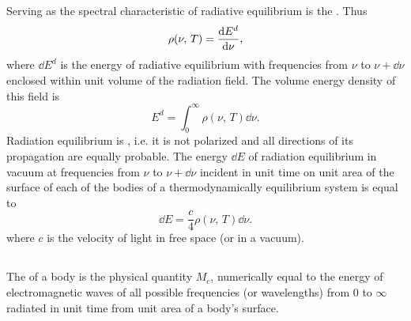 \subsection{}\label{36.1.3} Serving as the spectral characteristic of radiative equilibrium is the . Thus
\begin{equation*}%
\rho (\nu,\, T) = \dv{E^{d}}{\nu},
\end{equation*}
where $\dd E^{d}$ is the energy of radiative equilibrium with frequencies from $\nu$ to $\nu + \dd \nu$ enclosed within unit volume of the radiation field. The volume energy density of this field is
\begin{equation*}%
E^{d} = \int_{0}^{\infty} \rho (\nu,\, T) \dd \nu.
\end{equation*}
Radiation equilibrium is , i.e. it is not polarized and all directions of its propagation are equally probable. The energy $\dd E$ of radiation equilibrium in vacuum at frequencies from $\nu$ to $\nu + \dd \nu$ incident in unit time on unit area of the surface of each of the bodies of a thermodynamically equilibrium system is equal to
\begin{equation*}%
\dd E = \frac{c}{4} \rho (\nu,\, T) \dd \nu.
\end{equation*}
where $c$ is the velocity of light in free space (or in a vacuum).

\subsection{}\label{36.1.4} The   of a body is the physical quantity $M_{c}$, numerically equal to the energy of
electromagnetic waves of all possible frequencies (or wavelengths) from 0 to $\infty$ radiated in unit time from unit area of a body's surface.



